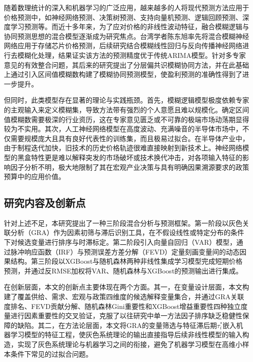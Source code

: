 \documentclass[a4paper,12pt,fontset=fandol]{ctexart}
\begin{document}
随着数理统计的深入和机器学习的广泛应用，越来越多的人将现代预测方法应用于价格预测中，如神经网络预测、决策树预测、支持向量机预测、逻辑回顾预测、深度学习预测等。而近十多年来，为了应对价格的非线性波动特征，融合模糊逻辑与协同预测思想的混合模型逐渐成为研究焦点。台湾学者陈东旭率先将混合模糊神经网络应用于存储芯片价格预测\cite{chen2013}，后续研究结合模糊线性回归与反向传播神经网络进行去模糊化处理，结果证实该方法的预测精度优于传统ARIMA模型\cite{chen2014}。针对多专家意见的有效整合问题，其后来的研究提出了分层偏共识模糊协同方法\cite{chen2016}，并在此基础上通过引入区间值模糊数构建了模糊协同预测模型，使盈利预测的准确性得到了进一步提升\cite{chen2021}。

但同时，此类模型存在显著的理论与实践瓶颈。首先，模糊逻辑模型极度依赖专家的主观输入来定义模糊集，导致方法带有强烈的个人意愿且难以规模化。确定区间值模糊数需要极深的行业资历，这在专家意见匮乏或不可靠的极端市场动荡期显得较为不实用。其次，人工神经网络模型在高度波动、充满噪音的半导体市场中，不仅需要规模庞大且具有良好代表性的训练集，而且极易过拟合。在半导体产业中，由于制程迭代加快，旧技术的历史价格轨迹很难直接映射到新技术上。神经网络模型的黑盒特性更是难以解释突发的市场破坏或技术换代冲击，对各项输入特征的影响因子分析不明，极大地限制了其在宏观产业决策与具有明确因果溯源要求的政策预算中的应用价值。


\subsection{研究内容及创新点}

针对上述不足，本研究提出了一种三阶段混合分析与预测框架。第一阶段以灰色关联分析（GRA）作为因素初筛与滞后识别工具，在不假设线性或特定分布的条件下对候选变量进行排序与时滞标定。第二阶段引入向量自回归（VAR）模型，通过脉冲响应函数（IRF）与预测误差方差分解（FEVD）定量刻画变量间的动态因果结构。第三阶段以XGBoost与随机森林两种非线性集成学习模型完成短期价格预测，并通过反RMSE加权将VAR、随机森林与XGBoost的预测输出进行集成\cite{wang2023}。

在创新层面，本文的创新点主要体现在两个方面。其一，在变量设计层面，本文构建了覆盖供给、需求、宏观与政策四维度的候选解释变量集合，并通过GRA关联度排名、FEVD贡献分解、随机森林Gini重要性和XGBoost增益重要性四种独立度量进行因素重要性的交叉验证，克服了以往研究中单一方法因子排序缺乏稳健性保障的缺陷。其二，在方法论层面，本文将GRA的变量筛选与特征滞后期$\tau_i^*$嵌入机器学习模型的特征工程，使灰色系统理论的输出直接指导后续非线性模型的输入构造，实现了灰色系统理论与机器学习之间的衔接，避免了机器学习模型在高维小样本条件下常见的过拟合问题。

\end{document}
